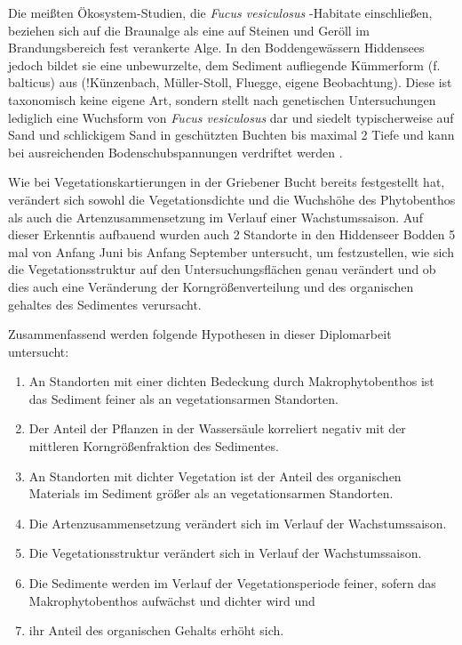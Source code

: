 Die meißten Ökosystem-Studien, die \textit{Fucus vesiculosus} -Habitate einschließen, beziehen sich auf die Braunalge als eine auf Steinen und Geröll im Brandungsbereich fest verankerte Alge.
In den Boddengewässern Hiddensees jedoch bildet sie eine unbewurzelte, dem Sediment aufliegende Kümmerform (f. balticus) aus \citep{k}(!Künzenbach, Müller-Stoll, Fluegge, eigene Beobachtung).  Diese ist taxonomisch keine eigene Art, sondern stellt nach genetischen Untersuchungen lediglich eine Wuchsform von \textit{Fucus vesiculosus} dar \citep{athanasiadis_1996} und siedelt typischerweise auf Sand und schlickigem Sand in geschützten Buchten bis maximal \unit{2}{\metre} Tiefe \citep{helcom_red_list_macrophyte_expert_group_2013} und kann bei ausreichenden Bodenschubspannungen verdriftet werden \citep{canal-verges_2010}.

Wie \cite{flugge_2004} bei Vegetationskartierungen in der Griebener Bucht bereits festgestellt hat, verändert sich sowohl die Vegetationsdichte und die Wuchshöhe des Phytobenthos als auch die Artenzusammensetzung im Verlauf einer Wachstumssaison. Auf dieser Erkenntis aufbauend wurden auch 2 Standorte in den Hiddenseer Bodden 5 mal von Anfang Juni bis Anfang September untersucht, um festzustellen, wie sich die Vegetationsstruktur auf den Untersuchungsflächen genau verändert und ob dies auch eine Veränderung der Korngrößenverteilung und des organischen gehaltes des Sedimentes verursacht.


Zusammenfassend werden folgende Hypothesen in dieser Diplomarbeit untersucht: 
\\
\begin{enumerate}[label=\Roman{*},leftmargin=1.5cm]
\item An Standorten mit einer dichten Bedeckung durch Makrophytobenthos ist das Sediment feiner als an vegetationsarmen Standorten.
\item Der Anteil der Pflanzen in der Wassersäule korreliert negativ mit der mittleren Korngrößenfraktion des Sedimentes.
\item An Standorten mit dichter Vegetation ist der Anteil des organischen Materials im Sediment größer als an vegetationsarmen Standorten.
\item Die Artenzusammensetzung verändert sich im Verlauf der Wachstumssaison.
\item Die Vegetationsstruktur verändert sich in Verlauf der Wachstumssaison.
\item Die Sedimente werden im Verlauf der Vegetationsperiode feiner, sofern das Makrophytobenthos aufwächst und dichter wird und 
\item ihr Anteil des organischen Gehalts erhöht sich.
\end{enumerate}
